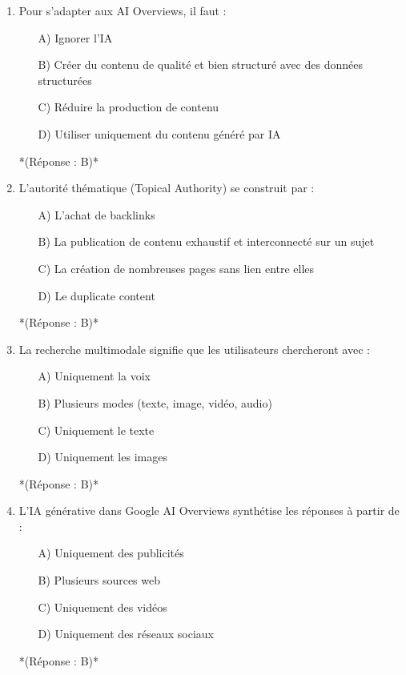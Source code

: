 \documentclass[12pt,a4paper,twoside]{report}
\begin{document}
\begin{enumerate}
    \item Pour s'adapter aux AI Overviews, il faut :
    \begin{itemize}
        \item[A)] Ignorer l'IA
        \item[B)] Créer du contenu de qualité et bien structuré avec des données structurées
        \item[C)] Réduire la production de contenu
        \item[D)] Utiliser uniquement du contenu généré par IA
    \end{itemize}
    *(Réponse : B)*

    \item L'autorité thématique (Topical Authority) se construit par :
    \begin{itemize}
        \item[A)] L'achat de backlinks
        \item[B)] La publication de contenu exhaustif et interconnecté sur un sujet
        \item[C)] La création de nombreuses pages sans lien entre elles
        \item[D)] Le duplicate content
    \end{itemize}
    *(Réponse : B)*

    \item La recherche multimodale signifie que les utilisateurs chercheront avec :
    \begin{itemize}
        \item[A)] Uniquement la voix
        \item[B)] Plusieurs modes (texte, image, vidéo, audio)
        \item[C)] Uniquement le texte
        \item[D)] Uniquement les images
    \end{itemize}
    *(Réponse : B)*

    \item L'IA générative dans Google AI Overviews synthétise les réponses à partir de :
    \begin{itemize}
        \item[A)] Uniquement des publicités
        \item[B)] Plusieurs sources web
        \item[C)] Uniquement des vidéos
        \item[D)] Uniquement des réseaux sociaux
    \end{itemize}
    *(Réponse : B)*


\end{enumerate}
\end{document}
